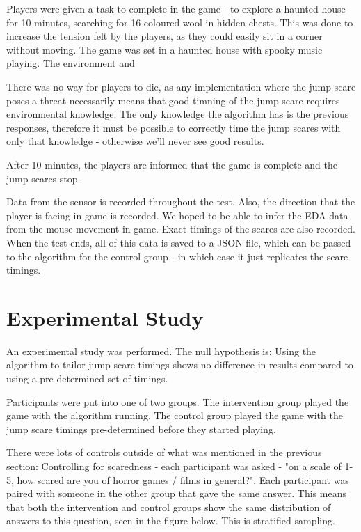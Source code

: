 \documentclass[12pt,a4paper]{article}\usepackage[]{graphicx}\usepackage[]{color}
\begin{document}

Players were given a task to complete in the game - to explore a haunted house for 10 minutes, searching for 16 coloured wool in hidden chests.
This was done to increase the tension felt by the players, as they could easily sit in a corner without moving.
The game was set in a haunted house with spooky music playing. The environment and 

There was no way for players to die, as any implementation where the jump-scare poses a threat necessarily means that good timning of the jump scare requires environmental knowledge.
The only knowledge the algorithm has is the previous responses, therefore it must be possible to correctly time the jump scares with only that knowledge - otherwise we'll never see good results.

After 10 minutes, the players are informed that the game is complete and the jump scares stop.

Data from the sensor is recorded throughout the test.
Also, the direction that the player is facing in-game is recorded.
We hoped to be able to infer the EDA data from the mouse movement in-game.
Exact timings of the scares are also recorded.
When the test ends, all of this data is saved to a JSON file, which can be passed to the algorithm for the control group - in which case it just replicates the scare timings.

\section{Experimental Study}


An experimental study was performed.
The null hypothesis is: Using the algorithm to tailor jump scare timings shows no difference in results compared to using a pre-determined set of timings.

Participants were put into one of two groups.
The intervention group played the game with the algorithm running.
The control group played the game with the jump scare timings pre-determined before they started playing.

There were lots of controls outside of what was mentioned in the previous section:
Controlling for scaredness - each participant was asked - "on a scale of 1-5, how scared are you of horror games / films in general?".
Each participant was paired with someone in the other group that gave the same answer.
This means that both the intervention and control groups show the same distribution of answers to this question, seen in the figure below.
This is stratified sampling.
\end{document}

